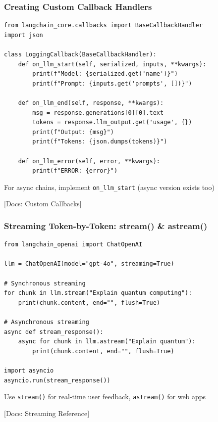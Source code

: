 \documentclass[aspectratio=169,11pt]{beamer}
\newcommand{\docref}[1]{{\scriptsize\color{docgray}[Docs: #1]}}
\begin{document}
\begin{frame}[fragile]
  \frametitle{Creating Custom Callback Handlers}

  \begin{lstlisting}
from langchain_core.callbacks import BaseCallbackHandler
import json

class LoggingCallback(BaseCallbackHandler):
    def on_llm_start(self, serialized, inputs, **kwargs):
        print(f"Model: {serialized.get('name')}")
        print(f"Prompt: {inputs.get('prompts', [])}")

    def on_llm_end(self, response, **kwargs):
        msg = response.generations[0][0].text
        tokens = response.llm_output.get('usage', {})
        print(f"Output: {msg}")
        print(f"Tokens: {json.dumps(tokens)}")

    def on_llm_error(self, error, **kwargs):
        print(f"ERROR: {error}")
  \end{lstlisting}

  \vspace{0.1cm}

  \begin{tipbox}
    For async chains, implement \texttt{on\_llm\_start} (async version exists too)
  \end{tipbox}

  \docref{Custom Callbacks}
\end{frame}


\begin{frame}[fragile]
  \frametitle{Streaming Token-by-Token: stream() \& astream()}

  \begin{lstlisting}
from langchain_openai import ChatOpenAI

llm = ChatOpenAI(model="gpt-4o", streaming=True)

# Synchronous streaming
for chunk in llm.stream("Explain quantum computing"):
    print(chunk.content, end="", flush=True)

# Asynchronous streaming
async def stream_response():
    async for chunk in llm.astream("Explain quantum"):
        print(chunk.content, end="", flush=True)

import asyncio
asyncio.run(stream_response())
  \end{lstlisting}

  \vspace{0.1cm}

  \begin{conceptbox}
    Use \texttt{stream()} for real-time user feedback, \texttt{astream()} for web apps
  \end{conceptbox}

  \docref{Streaming Reference}
\end{frame}
\end{document}
